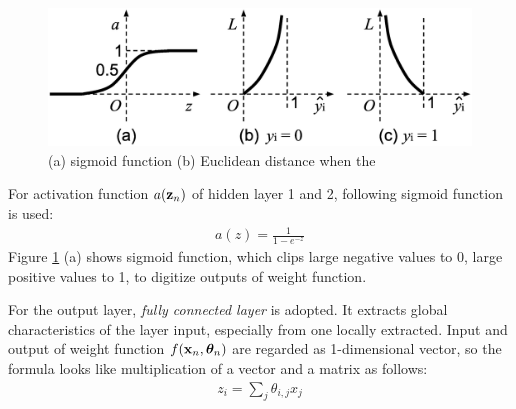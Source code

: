 \documentclass[twocolumn]{article}
\begin{document}
\begin{figure}[!tb]
 \begin{center}
  \begin{minipage}{\hsize}
   \includegraphics[width=\hsize]{fig/curves_03.eps}
   \caption{(a) sigmoid function
    (b) Euclidean distance when the}
   \label{fig:curves}
  \end{minipage}
 \end{center}
\end{figure}

For activation function $a({\bf z}_n)$ of hidden layer 1 and 2,
following sigmoid function is used:
\begin{eqnarray}
a(z) = \frac{1}{1-e^{-z}}
\end{eqnarray}
Figure \ref{fig:curves} (a) shows sigmoid function,
which clips large negative values to 0, large positive values to 1,
to digitize outputs of weight function.

For the output layer, {\it fully connected layer} is adopted.
It extracts global characteristics of the layer input,
especially from one locally extracted.
Input and output of weight function 
$f({\bf x}_n, {\bm \theta}_n)$
are regarded as 1-dimensional vector,
so the formula looks like multiplication of a vector and a matrix as follows:
\begin{eqnarray}
z_i = \sum_{j} \theta_{i,j} x_{j}
\end{eqnarray}
\end{document}
